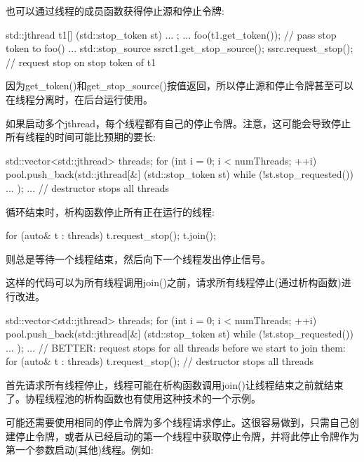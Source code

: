 也可以通过线程的成员函数获得停止源和停止令牌:

\begin{cpp}
std::jthread t1{[] (std::stop_token st) {
						...
				}};
...
foo(t1.get_token()); // pass stop token to foo()
...
std::stop_source ssrc{t1.get_stop_source()};
ssrc.request_stop(); // request stop on stop token of t1
\end{cpp}

因为get\_token()和get\_stop\_source()按值返回，所以停止源和停止令牌甚至可以在线程分离时，在后台运行使用。


如果启动多个jthread，每个线程都有自己的停止令牌。注意，这可能会导致停止所有线程的时间可能比预期的要长:

\begin{cpp}
{
	std::vector<std::jthread> threads;
	for (int i = 0; i < numThreads; ++i) {
		pool.push_back(std::jthread{[&] (std::stop_token st) {
				while (!st.stop_requested()) {
					...
				}
		}});
	}
	...
} // destructor stops all threads
\end{cpp}

循环结束时，析构函数停止所有正在运行的线程:

\begin{cpp}
for (auto& t : threads) {
	t.request_stop();
	t.join();
}
\end{cpp}

则总是等待一个线程结束，然后向下一个线程发出停止信号。

这样的代码可以为所有线程调用join()之前，请求所有线程停止(通过析构函数)进行改进。

\begin{cpp}
{
	std::vector<std::jthread> threads;
	for (int i = 0; i < numThreads; ++i) {
		pool.push_back(std::jthread{[&] (std::stop_token st) {
				while (!st.stop_requested()) {
					...
				}
		}});
	}
	...
	// BETTER: request stops for all threads before we start to join them:
	for (auto& t : threads) {
		t.request_stop();
	}
} // destructor stops all threads
\end{cpp}

首先请求所有线程停止，线程可能在析构函数调用join()让线程结束之前就结束了。协程线程池的析构函数也有使用这种技术的一个示例。


可能还需要使用相同的停止令牌为多个线程请求停止。这很容易做到，只需自己创建停止令牌，或者从已经启动的第一个线程中获取停止令牌，并将此停止令牌作为第一个参数启动(其他)线程。例如:

